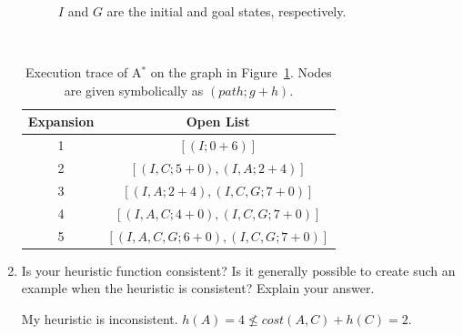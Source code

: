 \documentclass[12pt]{article}
\newenvironment{problem}[2][Problem]{\begin{trivlist}
\item[\hskip \labelsep {\bfseries #1}\hskip \labelsep {\bfseries #2.}]}{\end{trivlist}}
\begin{document}
\begin{problem}{3}
\begin{enumerate}
\begin{figure}[h]
				\caption{$I$ and $G$ are the initial and goal states, respectively.}
				\label{fig:p3graph}
			\end{figure} \\
			\begin{table}[h]
				\centering
				\begin{tabular}{c|c}
					Expansion & Open List \\ %
					\hline
					1 & $[(I; 0+6)]$ \\
					2 & $[(I,C; 5+0), (I,A; 2+4)]$ \\
					3 & $[(I,A; 2+4), (I,C,G; 7+0)]$  \\
					4 & $[(I,A,C; 4+0), (I,C,G; 7+0)]$  \\
					5 & $[(I,A,C,G; 6+0), (I,C,G; 7+0)]$ \\
				\end{tabular}
				\caption{Execution trace of A$^*$ on the graph in Figure~\ref{fig:p3graph}. Nodes are given symbolically as $(path; g+h)$.}%
				\label{tbl:trace}
			\end{table}
		\item Is your heuristic function consistent? Is it generally possible to create such an example when the heuristic is consistent? Explain your answer.

			\vspace{0.25cm}
			My heuristic is inconsistent. $h(A) = 4 \nleq cost(A,C) + h(C) = 2$.
\end{enumerate}
\end{problem}
\end{document}
